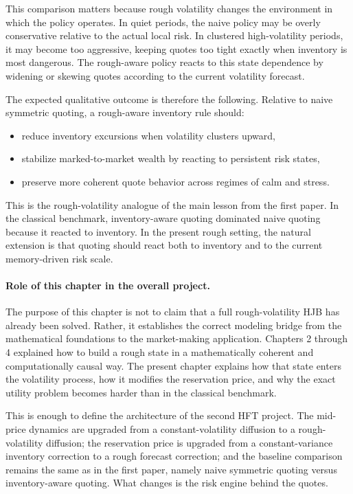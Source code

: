 \documentclass[a4paper,10pt,titlepage,oneside,openany]{book}
\theoremstyle{plain}
\theoremstyle{definition}
\theoremstyle{remark}
\newcommand{\1}{\mathbf{1}}
\begin{document}
This comparison matters because rough volatility changes the environment in which the policy operates. In quiet periods, the naive policy may be overly conservative relative to the actual local risk. In clustered high-volatility periods, it may become too aggressive, keeping quotes too tight exactly when inventory is most dangerous. The rough-aware policy reacts to this state dependence by widening or skewing quotes according to the current volatility forecast.

The expected qualitative outcome is therefore the following. Relative to naive symmetric quoting, a rough-aware inventory rule should:
\begin{itemize}
    \item reduce inventory excursions when volatility clusters upward,
    \item stabilize marked-to-market wealth by reacting to persistent risk states,
    \item preserve more coherent quote behavior across regimes of calm and stress.
\end{itemize}
This is the rough-volatility analogue of the main lesson from the first paper. In the classical benchmark, inventory-aware quoting dominated naive quoting because it reacted to inventory. In the present rough setting, the natural extension is that quoting should react both to inventory and to the current memory-driven risk scale.

\paragraph{Role of this chapter in the overall project.}

The purpose of this chapter is not to claim that a full rough-volatility HJB has already been solved. Rather, it establishes the correct modeling bridge from the mathematical foundations to the market-making application. Chapters 2 through 4 explained how to build a rough state in a mathematically coherent and computationally causal way. The present chapter explains how that state enters the volatility process, how it modifies the reservation price, and why the exact utility problem becomes harder than in the classical benchmark.

This is enough to define the architecture of the second HFT project. The mid-price dynamics are upgraded from a constant-volatility diffusion to a rough-volatility diffusion; the reservation price is upgraded from a constant-variance inventory correction to a rough forecast correction; and the baseline comparison remains the same as in the first paper, namely naive symmetric quoting versus inventory-aware quoting. What changes is the risk engine behind the quotes.
\end{document}
